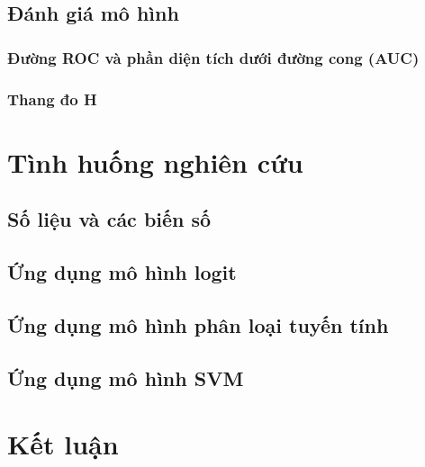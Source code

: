 \documentclass[a4paper]{report}\usepackage[]{graphicx}\usepackage[]{color}
\begin{document}
\section{Đánh giá mô hình}
\subsection{Đường ROC và phần diện tích dưới đường cong (AUC)}
\subsection{Thang đo H}


\chapter{Tình huống nghiên cứu}

\section{Số liệu và các biến số}


\section{Ứng dụng mô hình logit}

\section{Ứng dụng mô hình phân loại tuyến tính}

\section{Ứng dụng mô hình SVM}


\chapter{Kết luận}


\end{document}
